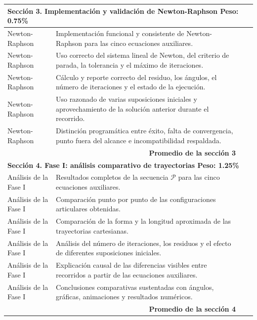 \documentclass[12pt]{article}
\begin{document}
{\begin{longtable}{|p{3.7cm}|p{7.0cm}|>{\centering\arraybackslash}p{1cm}|p{3.0cm}|}
\multicolumn{4}{|l|}{\textbf{Sección 3. Implementación y validación de Newton-Raphson \hfill Peso: 0.75\%}}\\
\hline
Newton-Raphson &
Implementación funcional y consistente de Newton-Raphson para las cinco ecuaciones auxiliares. & & \\
\hline
Newton-Raphson &
Uso correcto del sistema lineal de Newton, del criterio de parada, la tolerancia y el máximo de iteraciones. & & \\
\hline
Newton-Raphson &
Cálculo y reporte correcto del residuo, los ángulos, el número de iteraciones y el estado de la ejecución. & & \\
\hline
Newton-Raphson &
Uso razonado de varias suposiciones iniciales y aprovechamiento de la solución anterior durante el recorrido. & & \\
\hline
Newton-Raphson &
Distinción programática entre éxito, falta de convergencia, punto fuera del alcance e incompatibilidad respaldada. & & \\
\hline
\multicolumn{2}{|r|}{\textbf{Promedio de la sección 3}} & & \\
\hline

\multicolumn{4}{|l|}{\textbf{Sección 4. Fase I: análisis comparativo de trayectorias \hfill Peso: 1.25\%}}\\
\hline
Análisis de la Fase I &
Resultados completos de la secuencia \(\mathcal P\) para las cinco ecuaciones auxiliares. & & \\
\hline
Análisis de la Fase I &
Comparación punto por punto de las configuraciones articulares obtenidas. & & \\
\hline
Análisis de la Fase I &
Comparación de la forma y la longitud aproximada de las trayectorias cartesianas. & & \\
\hline
Análisis de la Fase I &
Análisis del número de iteraciones, los residuos y el efecto de diferentes suposiciones iniciales. & & \\
\hline
Análisis de la Fase I &
Explicación causal de las diferencias visibles entre recorridos a partir de las ecuaciones auxiliares. & & \\
\hline
Análisis de la Fase I &
Conclusiones comparativas sustentadas con ángulos, gráficas, animaciones y resultados numéricos. & & \\
\hline
\multicolumn{2}{|r|}{\textbf{Promedio de la sección 4}} & & \\
\hline


\end{longtable}}
\end{document}
